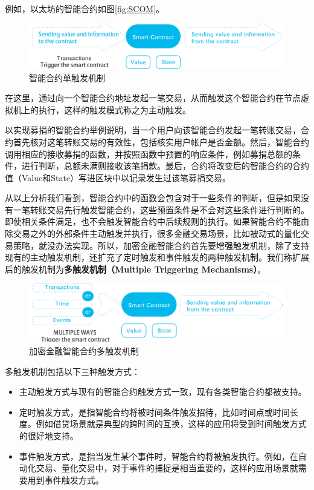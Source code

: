 \documentclass[a4paper,12pt]{article}
\begin{document}
例如，以太坊的智能合约如图\ref{fig:SCOM}。

\begin{figure}[htbp]
\centering\includegraphics[width=5in]{pic/singletrigger.png}
\caption{智能合约单触发机制}\label{fig:1}
\end{figure}

在这里，通过向一个智能合约地址发起一笔交易，从而触发这个智能合约在节点虚拟机上的执行，这样的触发模式称之为主动触发。

以实现募捐的智能合约举例说明，当一个用户向该智能合约发起一笔转账交易，合约首先核对这笔转账交易的有效性，包括核实用户帐户是否金额。然后，智能合约调用相应的接收募捐的函数，并按照函数中预置的响应条件，例如募捐总额的条件，进行判断，总额未满则接收该笔捐款。最后，合约将改变后的智能合约的合约值（Value和State）写进区块中以记录发生过该笔募捐交易。

从以上分析我们看到，智能合约中的函数会包含对于一些条件的判断，但是如果没有一笔转账交易先行触发智能合约，这些预置条件是不会对这些条件进行判断的。即使相关条件满足，也不会触发智能合约中后续规则的执行。如果智能合约不能由除交易之外的外部条件主动触发并执行，很多金融交易场景，比如被动式的量化交易策略，就没办法实现。所以，加密金融智能合约首先要增强触发机制，除了支持现有的主动触发机制，还扩充了定时触发和事件触发的两种触发机制。我们称扩展后的触发机制为{\bfseries 多触发机制（Multiple Triggering Mechanisms）}。

\begin{figure}[htbp]
\centering\includegraphics[width=5in]{pic/multipletrigger.png}
\caption{加密金融智能合约多触发机制}\label{fig:1}
\end{figure}

多触发机制包括以下三种触发方式：

\begin{itemize}[itemindent=1em]
	\item 主动触发方式与现有的智能合约触发方式一致，现有各类智能合约都被支持。
	\item 定时触发方式，是指智能合约将被时间条件触发招待，比如时间点或时间长度。例如借贷场景就是典型的跨时间的互换，这样的应用将受到时间触发方式的很好地支持。
	\item 事件触发方式，是指当发生某个事件时，智能合约将被触发执行。例如，在自动化交易、量化交易中，对于事件的捕捉是相当重要的，这样的应用场景就需要用到事件触发方式。
\end{itemize}
\end{document}

